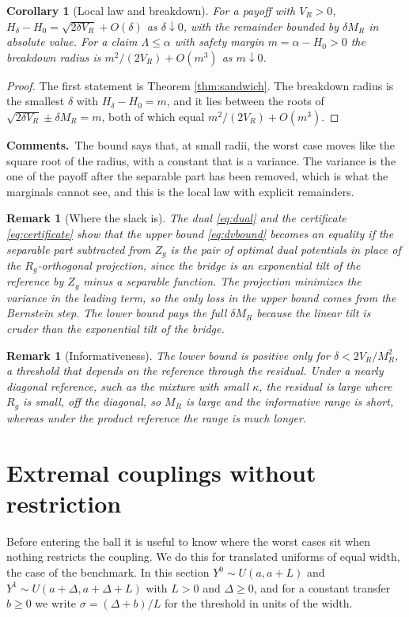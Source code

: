 \documentclass[11pt,a4paper]{article}
\theoremstyle{notesplain}
\newtheorem{corollary}[theorem]{Corollary}
\theoremstyle{notesupright}
\newtheorem{remark}[theorem]{Remark}
\numberwithin{equation}{section}
\newcommand{\comments}{\par\smallskip\noindent\textbf{Comments.}\ }
\begin{document}
\begin{corollary}[Local law and breakdown]
\label{cor:local}
For a payoff with $V_R>0$, $H_\delta-H_0=\sqrt{2\delta V_R}+O(\delta)$ as $\delta\downarrow0$, with the remainder bounded by $\delta M_R$ in absolute value. For a claim $\Lambda\le\alpha$ with safety margin $m=\alpha-H_0>0$ the breakdown radius is $m^2/(2V_R)+O(m^3)$ as $m\downarrow0$.
\end{corollary}

\begin{proof}
The first statement is Theorem \ref{thm:sandwich}. The breakdown radius is the smallest $\delta$ with $H_\delta-H_0=m$, and it lies between the roots of $\sqrt{2\delta V_R}\pm\delta M_R=m$, both of which equal $m^2/(2V_R)+O(m^3)$.
\end{proof}

\comments The bound says that, at small radii, the worst case moves like the square root of the radius, with a constant that is a variance. The variance is the one of the payoff after the separable part has been removed, which is what the marginals cannot see, and this is the local law with explicit remainders.

\begin{remark}[Where the slack is]
The dual \eqref{eq:dual} and the certificate \eqref{eq:certificate} show that the upper bound \eqref{eq:dvbound} becomes an equality if the separable part subtracted from $Z_g$ is the pair of optimal dual potentials in place of the $R_g$-orthogonal projection, since the bridge is an exponential tilt of the reference by $Z_g$ minus a separable function. The projection minimizes the variance in the leading term, so the only loss in the upper bound comes from the Bernstein step. The lower bound pays the full $\delta M_R$ because the linear tilt is cruder than the exponential tilt of the bridge.
\end{remark}

\begin{remark}[Informativeness]
The lower bound is positive only for $\delta<2V_R/M_R^2$, a threshold that depends on the reference through the residual. Under a nearly diagonal reference, such as the mixture with small $\kappa$, the residual is large where $R_g$ is small, off the diagonal, so $M_R$ is large and the informative range is short, whereas under the product reference the range is much longer.
\end{remark}

\section{Extremal couplings without restriction}
\label{sec:extremal}
Before entering the ball it is useful to know where the worst cases sit when nothing restricts the coupling. We do this for translated uniforms of equal width, the case of the benchmark. In this section $Y^0\sim U(a,a+L)$ and $Y^1\sim U(a+\Delta,a+\Delta+L)$ with $L>0$ and $\Delta\ge0$, and for a constant transfer $b\ge0$ we write $\sigma=(\Delta+b)/L$ for the threshold in units of the width.
\end{document}
